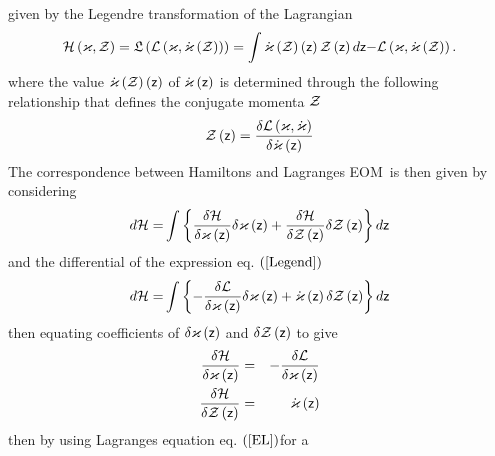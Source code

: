 given by the Legendre transformation of the Lagrangian 
\begin{equation}
{\cal H}\left( {\cal \varkappa },{\cal Z}\right) ={\frak L}\left( {\cal L}%
\left( {\cal \varkappa },{\cal \dot{\varkappa}}\left( {\cal Z}\right)
\right) \right) =\int {\cal \dot{\varkappa}}\left( {\cal Z}\right) \left( 
{\sf z}\right) {\cal Z}\left( {\sf z}\right) d{\sf z-}{\cal L}\left( {\cal %
\varkappa },{\cal \dot{\varkappa}}\left( {\cal Z}\right) \right) .
\label{Legend}
\end{equation}%
where the value ${\cal \dot{\varkappa}}\left( {\cal Z}\right) \left( {\sf z}%
\right) $ of ${\cal \dot{\varkappa}}\left( {\sf z}\right) $ is determined
through the following relationship that defines the conjugate momenta ${\cal %
Z}$ 
\begin{equation}
{\cal Z\left( {\sf z}\right) }=\frac{\delta {\cal L}\left( {\cal \varkappa },%
{\cal \dot{\varkappa}}\right) }{\delta {\cal \dot{\varkappa}}\left( {\sf z}%
\right) }  \label{conjmom}
\end{equation}%
The correspondence between Hamiltons and Lagranges EOM\ is then given by
considering 
\begin{equation}
d{\cal H=}\int \left\{ \frac{\delta {\cal H}}{\delta {\cal \varkappa }\left( 
{\sf z}\right) }\delta {\cal \varkappa }\left( {\sf z}\right) +\frac{\delta 
{\cal H}}{\delta {\cal Z}\left( {\sf z}\right) }\delta {\cal Z}\left( {\sf z}%
\right) \right\} d{\sf z}
\end{equation}%
and the differential of the expression eq. $\left( \ref{Legend}\right) $ 
\begin{equation}
d{\cal H=}\int \left\{ -\frac{\delta {\cal L}}{\delta {\cal \varkappa }%
\left( {\sf z}\right) }\delta {\cal \varkappa }\left( {\sf z}\right) +{\cal 
\dot{\varkappa}}\left( {\sf z}\right) \delta {\cal Z}\left( {\sf z}\right)
\right\} d{\sf z}
\end{equation}%
then equating coefficients of $\delta {\cal \varkappa }\left( {\sf z}\right) 
$ and $\delta {\cal Z}\left( {\sf z}\right) $ to give 
\begin{eqnarray}
\frac{\delta {\cal H}}{\delta {\cal \varkappa }\left( {\sf z}\right) } &=&-%
\frac{\delta {\cal L}}{\delta {\cal \varkappa }\left( {\sf z}\right) }
\label{HE1} \\
\frac{\delta {\cal H}}{\delta {\cal Z}\left( {\sf z}\right) } &=&{\cal \dot{%
\varkappa}}\left( {\sf z}\right)   \label{HE2}
\end{eqnarray}%
then by using Lagranges equation eq. $\left( \ref{EL}\right) $for a
